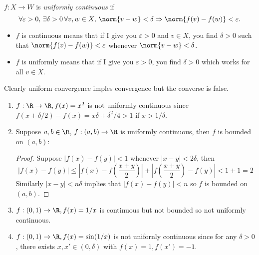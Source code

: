 \documentclass[a4paper]{article}
\theoremstyle{definition}
\begin{document}
\begin{definition}
  \(f: X \to W\) is \emph{uniformly continuous} if
  \[
    \forall \varepsilon>0, \, \exists \delta>0 \, \forall v, w \in X, \, \norm{v - w} < \delta \Rightarrow \norm{f(v) - f(w)} < \varepsilon.
  \]
\end{definition}

\begin{note}\leavevmode
  \begin{itemize}
  \item \(f\) is continuous means that if I give you \(\varepsilon > 0\) and \(v \in X\), you find \(\delta > 0\) such that \(\norm{f(v) - f(w)} < \varepsilon\) whenever \(\norm{v - w} < \delta\).
  \item \(f\) is uniformly means that if I give you \(\varepsilon > 0\), you find \(\delta > 0\) which works for all \(v \in X\).
  \end{itemize}
\end{note}

Clearly uniform convergence imples convergence but the converse is false.

\begin{eg}\leavevmode
  \begin{enumerate}
  \item \(f: \R \to \R, f(x) = x^2\) is not uniformly continuous since \(f(x + \delta/2) - f(x) = x \delta + \delta^2/4 > 1\) if \(x > 1/\delta\).
  \item Suppose \(a, b \in \R\), \(f: (a, b) \to \R\) is uniformly continuous, then \(f\) is bounded on \((a, b)\):
    \begin{proof}
      Suppose \(|f(x) - f(y)| < 1\) whenever \(|x - y| < 2 \delta\), then
      \[
        |f(x) - f(y)| \leq \left| f(x) - f(\frac{x+y}{2}) \right| + \left| f(\frac{x+y}{2}) - f(y) \right| < 1 + 1 = 2
      \]
      Similarly \(|x - y| < n \delta\) implies that \(|f(x) - f(y)| < n\) so \(f\) is bounded on \((a, b)\).
    \end{proof}
    \item \(f:(0, 1) \to \R, f(x) = 1/x\) is continuous but not bounded so not uniformly continuous.
    \item \(f:(0, 1) \to \R, f(x) = \sin(1/x)\) is not unifornly continuous since for any \(\delta > 0\), there exists \(x, x' \in(0, \delta)\) with \(f(x) = 1, f(x') = -1\).
  \end{enumerate}
\end{eg}
\end{document}
